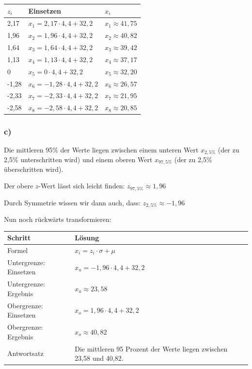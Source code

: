 \documentclass[
  11pt,
  ngerman,
  a4paper,
]{report}
\begin{document}
\begin{table}[H]
\centering
\begin{tabular}{lll}
\toprule
\textbf{$z_i$} & \textbf{Einsetzen} & \textbf{$x_i$}\\
\midrule
2,17 & $x_{1} = 2{,}17 \cdot 4{,}4 + 32{,}2$ & $x_{1}\approx41{,}75$\\
1,96 & $x_{2} = 1{,}96 \cdot 4{,}4 + 32{,}2$ & $x_{2}\approx40{,}82$\\
1,64 & $x_{3} = 1{,}64 \cdot 4{,}4 + 32{,}2$ & $x_{3}\approx39{,}42$\\
1,13 & $x_{4} = 1{,}13 \cdot 4{,}4 + 32{,}2$ & $x_{4}\approx37{,}17$\\
0 & $x_{5} = 0 \cdot 4{,}4 + 32{,}2$ & $x_{5}\approx32{,}20$\\
-1,28 & $x_{6} = -1{,}28 \cdot 4{,}4 + 32{,}2$ & $x_{6}\approx26{,}57$\\
-2,33 & $x_{7} = -2{,}33 \cdot 4{,}4 + 32{,}2$ & $x_{7}\approx21{,}95$\\
-2,58 & $x_{8} = -2{,}58 \cdot 4{,}4 + 32{,}2$ & $x_{8}\approx20{,}85$\\
\bottomrule
\end{tabular}
\end{table}

\hypertarget{c-7}{%
\subsubsection{c)}\label{c-7}}

Die mittleren 95\% der Werte liegen zwischen einem unteren Wert \(x_{2{,}5\%}\) (der zu 2,5\% unterschritten wird) und einem oberen Wert \(x_{97{,}5\%}\) (der zu 2,5\% überschritten wird).

Der obere \(z\)-Wert lässt sich leicht finden: \(z_{97{,}5\%} \approx 1{,}96\)

Durch Symmetrie wissen wir dann auch, dass: \(z_{2{,}5\%} \approx -1{,}96\)

Nun noch rückwärts transformieren:

\begin{table}[H]
\centering
\begin{tabular}{ll}
\toprule
\textbf{Schritt} & \textbf{Lösung}\\
\midrule
Formel & $x_{i} = z_{i} \cdot \sigma + \mu$\\
Untergrenze: Einsetzen & $x_{u} = -1{,}96 \cdot 4{,}4 + 32{,}2$\\
Untergrenze: Ergebnis & $x_{u}\approx23{,}58$\\
Obergrenze: Einsetzen & $x_{o} = 1{,}96 \cdot 4{,}4 + 32{,}2$\\
Obergrenze: Ergebnis & $x_{o}\approx40{,}82$\\
Antwortsatz & Die mittleren 95 Prozent der Werte liegen zwischen 23,58 und 40,82.\\
\bottomrule
\end{tabular}
\end{table}
\end{document}
